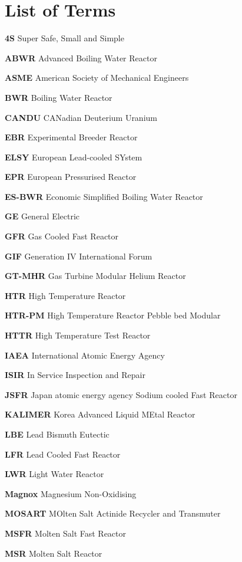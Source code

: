 \documentclass[journal]{IEEEtran}
\begin{document}
\section{List of Terms}
\footnotesize
\scriptsize
\textbf{4S} Super Safe, Small and Simple \par
\textbf{ABWR} Advanced Boiling Water Reactor\par
\textbf{ASME} American Society of Mechanical Engineers\par
\textbf{BWR} Boiling Water Reactor\par
\textbf{CANDU} CANadian Deuterium Uranium\par
\textbf{EBR} Experimental Breeder Reactor\par
\textbf{ELSY} European Lead-cooled SYstem\par
\textbf{EPR} European Pressurised Reactor\par
\textbf{ES-BWR} Economic Simplified Boiling Water Reactor\par
\textbf{GE} General Electric\par
\textbf{GFR} Gas Cooled Fast Reactor\par
\textbf{GIF} Generation IV International Forum\par
\textbf{GT-MHR} Gas Turbine Modular Helium Reactor\par
\textbf{HTR} High Temperature Reactor\par
\textbf{HTR-PM} High Temperature Reactor Pebble bed Modular\par
\textbf{HTTR} High Temperature Test Reactor\par
\textbf{IAEA} International Atomic Energy Agency\par
\textbf{ISIR} In Service Inspection and Repair\par
\textbf{JSFR} Japan atomic energy agency Sodium cooled Fast Reactor\par
\textbf{KALIMER} Korea Advanced Liquid MEtal Reactor\par
\textbf{LBE} Lead Bismuth Eutectic\par
\textbf{LFR} Lead Cooled Fast Reactor\par
\textbf{LWR} Light Water Reactor\par
\textbf{Magnox} Magnesium Non-Oxidising\par
\textbf{MOSART} MOlten Salt Actinide Recycler and Transmuter \par
\textbf{MSFR} Molten Salt Fast Reactor \par
\textbf{MSR} Molten Salt Reactor\par
\end{document}
